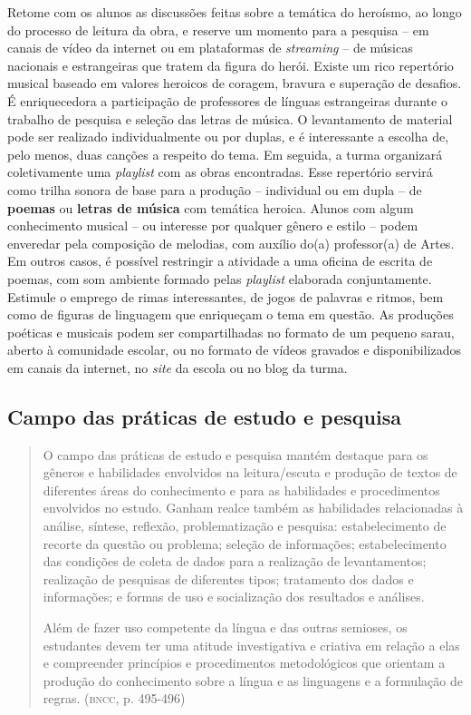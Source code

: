 \documentclass[11pt]{extarticle}
\begin{document}
  Retome com os alunos as discussões feitas sobre a temática do
  heroísmo, ao longo do processo de leitura da obra, e reserve um
  momento para a pesquisa -- em canais de vídeo da internet ou em
  plataformas de \emph{streaming} -- de músicas nacionais e estrangeiras
  que tratem da figura do herói. Existe um rico repertório musical
  baseado em valores heroicos de coragem, bravura e superação de
  desafios. É enriquecedora a participação de professores de línguas
  estrangeiras durante o trabalho de pesquisa e seleção das letras de
  música. O levantamento de material pode ser realizado individualmente
  ou por duplas, e é interessante a escolha de, pelo menos, duas canções
  a respeito do tema. Em seguida, a turma organizará coletivamente uma
  \emph{playlist} com as obras encontradas. Esse repertório servirá como
  trilha sonora de base para a produção -- individual ou em dupla -- de
  \textbf{poemas} ou \textbf{letras de música} com temática heroica.
  Alunos com algum conhecimento musical -- ou interesse por qualquer
  gênero e estilo -- podem enveredar pela composição de melodias, com
  auxílio do(a) professor(a) de Artes. Em outros casos, é possível
  restringir a atividade a uma oficina de escrita de poemas, com som
  ambiente formado pelas \emph{playlist} elaborada conjuntamente.
  Estimule o emprego de rimas interessantes, de jogos de palavras e
  ritmos, bem como de figuras de linguagem que enriqueçam o tema em
  questão. As produções poéticas e musicais podem ser compartilhadas no
  formato de um pequeno sarau, aberto à comunidade escolar, ou no
  formato de vídeos gravados e disponibilizados em canais da internet,
  no \emph{site} da escola ou no blog da turma.

\subsection{Campo das práticas de estudo e pesquisa}

\begin{quote}
O campo das práticas de estudo e pesquisa mantém destaque para os
gêneros e habilidades envolvidos na leitura/escuta e produção de textos
de diferentes áreas do conhecimento e para as habilidades e
procedimentos envolvidos no estudo. Ganham realce também as habilidades
relacionadas à análise, síntese, reflexão, problematização e pesquisa:
estabelecimento de recorte da questão ou problema; seleção de
informações; estabelecimento das condições de coleta de dados para a
realização de levantamentos; realização de pesquisas de diferentes
tipos; tratamento dos dados e informações; e formas de uso e
socialização dos resultados e análises.

Além de fazer uso competente da língua e das outras semioses, os
estudantes devem ter uma atitude investigativa e criativa em relação a
elas e compreender princípios e procedimentos metodológicos que orientam
a produção do conhecimento sobre a língua e as linguagens e a formulação
de regras. (\textsc{bncc}, p. 495-496)
\end{quote}
\end{document}
